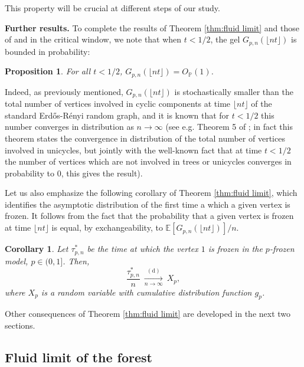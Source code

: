 \documentclass[a4, 11pt]{article}
\numberwithin{equation}{section}
\theoremstyle{plain}
\newtheorem{corollary}[theorem]{Corollary}
\newtheorem{proposition}[theorem]{Proposition}
\theoremstyle{definition}
\theoremstyle{remark}
\begin{document}
This property will be crucial at different steps of our study. 

\bigskip

\textbf{Further results.} To complete the results of Theorem \ref{thm:fluid limit} and those of  \cite{ContatCurien23} and \cite{viau25} in the critical window, we note that when $t<1/2$, the gel $G_{p,n}(\lfloor nt\rfloor)$ is bounded in probability: 

\begin{proposition}
For all $t<1/2$, $G_{p,n}(\lfloor nt\rfloor)=O_{\mathbb P}(1)$.
\end{proposition}

Indeed, as previously mentioned, $G_{p,n}(\lfloor nt\rfloor)$ is stochastically smaller than the total number of vertices involved in cyclic components at time $\lfloor nt\rfloor$ of the standard Erd\H{o}s-R\'enyi random graph, and it is known that for $t<1/2$ this number  converges in distribution as $n \rightarrow \infty$ (see e.g. Theorem 5 of \cite{Pittel88}; in fact this theorem states the convergence in distribution of the total number of vertices involved in unicycles, but jointly with the well-known fact that at time $t<1/2$ the number of vertices which are not involved in trees or unicycles converges in probability to 0, this gives the result). 

Let us also emphasize the following corollary of Theorem \ref{thm:fluid limit}, which
identifies the asymptotic distribution of the first time a which a given vertex is frozen. It follows from the fact that the probability that a given vertex is frozen at time $\lfloor nt \rfloor$ is equal, by exchangeability, to $\mathbb E[G_{p,n}(\lfloor nt \rfloor)]/n$. 

\begin{corollary}
\label{cor:entrance1}
Let $\tau^*_{p,n}$ be the time at which the vertex $1$ is frozen in the $p$-frozen model, $p \in (0,1]$. Then,
$$\frac{\tau^*_{p,n}}{n} ~ \underset{n \rightarrow \infty}{\overset{\mathrm{(d)}} \longrightarrow} ~X_{p},$$
where $X_{p}$ is a random variable with cumulative distribution function $g_p$.
\end{corollary}

Other consequences of Theorem \ref{thm:fluid limit} are developed in the next two sections.

\subsection{Fluid limit of the forest}
\end{document}
